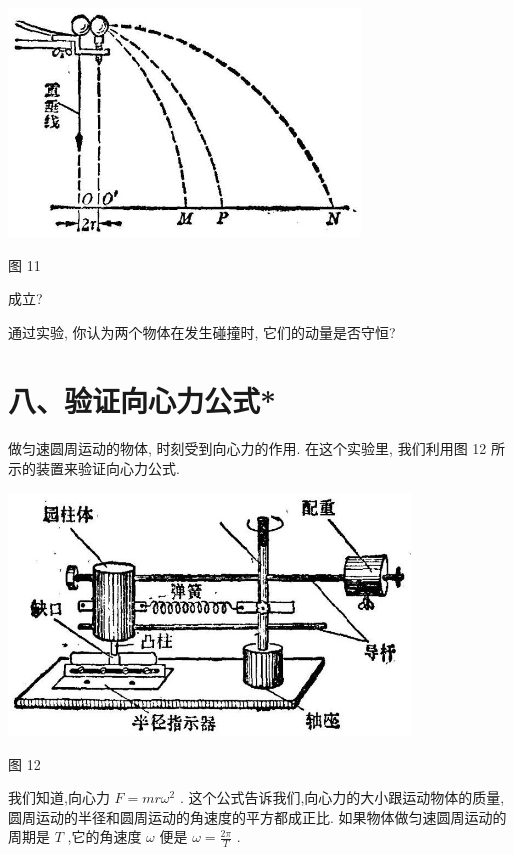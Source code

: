 \documentclass[10pt]{article}
\begin{document}
\begin{center}
\includegraphics[max width=0.7\textwidth]{images/01912d55-147c-70aa-b0e0-1782a122f948_331_616763.jpg}
\end{center}

图 11

成立?

通过实验, 你认为两个物体在发生碰撞时, 它们的动量是否守恒?

\section*{八、验证向心力公式*}

做匀速圆周运动的物体, 时刻受到向心力的作用. 在这个实验里, 我们利用图 12 所示的装置来验证向心力公式.

\begin{center}
\includegraphics[max width=0.8\textwidth]{images/01912d55-147c-70aa-b0e0-1782a122f948_331_402407.jpg}
\end{center}

图 12

我们知道,向心力 \(F = {mr}{\omega }^{2}\) . 这个公式告诉我们,向心力的大小跟运动物体的质量, 圆周运动的半径和圆周运动的角速度的平方都成正比. 如果物体做匀速圆周运动的周期是 \(T\) ,它的角速度 \(\omega\) 便是 \(\omega = \frac{2\pi }{T}\) .
\end{document}
